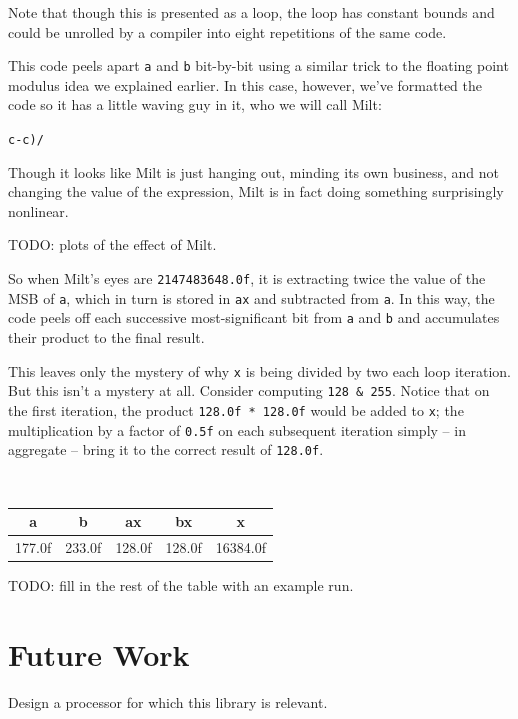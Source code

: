 \documentclass{acmsiggraph}
\theoremstyle{remark}
\theoremstyle{definition}
\begin{document}
Note that though this is presented as a loop, the loop has constant bounds and could be unrolled by a compiler into eight repetitions of the same code.

This code peels apart {\tt a} and {\tt b} bit-by-bit using a similar trick to the floating point modulus idea we explained earlier.
In this case, however, we've formatted the code so it has a little waving guy in it, who we will call Milt:

\begin{center}
\huge
{\tt c-c)/}
\end{center}

Though it looks like Milt is just hanging out, minding its own business, and not changing the value of the expression,
Milt is in fact doing something surprisingly nonlinear.

TODO: plots of the effect of Milt.

So when Milt's eyes are {\tt 2147483648.0f}, it is extracting twice the value of the MSB of {\tt a},
which in turn is stored in {\tt ax} and subtracted from {\tt a}.
In this way, the code peels off each successive most-significant bit from {\tt a} and {\tt b} and accumulates their product to the final result.

This leaves only the mystery of why {\tt x} is being divided by two each loop iteration.
But this isn't a mystery at all.
Consider computing {\tt 128 \& 255}.
Notice that on the first iteration, the product {\tt 128.0f * 128.0f} would be added to {\tt x};
the multiplication by a factor of {\tt 0.5f} on each subsequent iteration simply -- in aggregate -- bring it to the correct result of {\tt 128.0f}.

{ \tt
\begin{tabular}{r|r|r|r|r}
\multicolumn{1}{c|}{a} &
\multicolumn{1}{c|}{b} &
\multicolumn{1}{c|}{ax} &
\multicolumn{1}{c|}{bx} &
\multicolumn{1}{c}{x} \\\hline
177.0f & 233.0f & 128.0f & 128.0f & 16384.0f \\
\end{tabular}
}

TODO: fill in the rest of the table with an example run.

\section{Future Work} \label{sec:future}

Design a processor for which this library is relevant.
\end{document}
